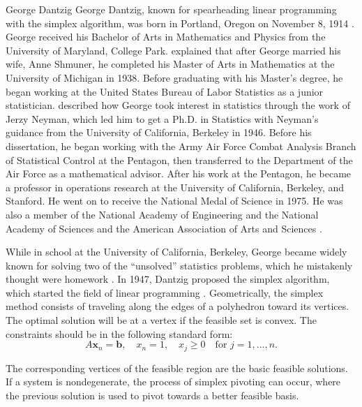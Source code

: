 \begin{refsection}
\begin{pioneerspotlight}{George Dantzig}
George Dantzig, known for spearheading linear programming with the simplex algorithm, was born in Portland, Oregon on November 8, 1914 \parencite[pp.~100–106]{gass_2008_memorial}. George received his Bachelor of Arts in Mathematics and Physics from the University of Maryland, College Park. \textcite{gass_2008_memorial} explained that after George married his wife, Anne Shmuner, he completed his Master of Arts in Mathematics at the University of Michigan in 1938. Before graduating with his Master’s degree, he began working at the United States Bureau of Labor Statistics as a junior statistician. \textcite{gass_2008_memorial} described how George took interest in statistics through the work of Jerzy Neyman, which led him to get a Ph.D. in Statistics with Neyman's guidance from the University of California, Berkeley in 1946. Before his dissertation, he began working with the Army Air Force Combat Analysis Branch of Statistical Control at the Pentagon, then transferred to the Department of the Air Force as a mathematical advisor. After his work at the Pentagon, he became a professor in operations research at the University of California, Berkeley, and Stanford. He went on to receive the National Medal of Science in 1975. He was also a member of the National Academy of Engineering and the National Academy of Sciences and the American Association of Arts and Sciences \parencite{ucberkeleyengineering_2018_george}. 
	
While in school at the University of California, Berkeley, George became widely known for solving two of the “unsolved” statistics problems, which he mistakenly thought were homework \parencite{ucberkeleyengineering_2018_george}. In 1947, Dantzig proposed the simplex algorithm, which started the field of linear programming \parencite{cottle_2007_george}. 
Geometrically, the simplex method consists of traveling along the edges of a polyhedron toward its vertices. The optimal solution will be at a vertex if the feasible set is convex. The constraints should be in the following standard form:
\[
A \mathbf{x}_n = \mathbf{b}, \quad x_n = 1, \quad x_j \geq 0 \quad \text{for } j = 1, \ldots, n.
\]

The corresponding vertices of the feasible region are the basic feasible solutions. If a system is nondegenerate, the process of simplex pivoting can occur, where the previous solution is used to pivot towards a better feasible basis. 


\end{pioneerspotlight}
\end{refsection}
